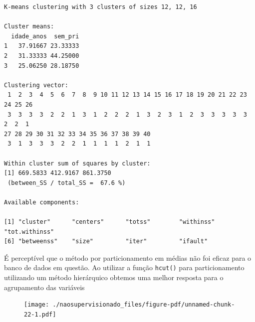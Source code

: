 \documentclass[
  letterpaper,
  DIV=11,
  numbers=noendperiod]{scrreprt}
\newenvironment{Shaded}{\begin{snugshade}}{\end{snugshade}}
\newcommand{\AttributeTok}[1]{\textcolor[rgb]{0.40,0.45,0.13}{#1}}
\newcommand{\DecValTok}[1]{\textcolor[rgb]{0.68,0.00,0.00}{#1}}
\newcommand{\FunctionTok}[1]{\textcolor[rgb]{0.28,0.35,0.67}{#1}}
\newcommand{\NormalTok}[1]{\textcolor[rgb]{0.00,0.23,0.31}{#1}}
\newcommand{\OtherTok}[1]{\textcolor[rgb]{0.00,0.23,0.31}{#1}}
\newcommand{\SpecialCharTok}[1]{\textcolor[rgb]{0.37,0.37,0.37}{#1}}
\newcommand{\StringTok}[1]{\textcolor[rgb]{0.13,0.47,0.30}{#1}}
\begin{document}
\begin{verbatim}
K-means clustering with 3 clusters of sizes 12, 12, 16

Cluster means:
  idade_anos  sem_pri
1   37.91667 23.33333
2   31.33333 44.25000
3   25.06250 28.18750

Clustering vector:
 1  2  3  4  5  6  7  8  9 10 11 12 13 14 15 16 17 18 19 20 21 22 23 24 25 26 
 3  3  3  3  2  2  1  3  1  2  2  2  1  3  2  3  1  2  3  3  3  3  3  2  2  1 
27 28 29 30 31 32 33 34 35 36 37 38 39 40 
 3  1  3  3  3  2  2  1  1  1  1  2  1  1 

Within cluster sum of squares by cluster:
[1] 669.5833 412.9167 861.3750
 (between_SS / total_SS =  67.6 %)

Available components:

[1] "cluster"      "centers"      "totss"        "withinss"     "tot.withinss"
[6] "betweenss"    "size"         "iter"         "ifault"      
\end{verbatim}

É perceptível que o método por particionamento em médias não foi eficaz
para o banco de dados em questão. Ao utilizar a função \texttt{hcut()}
para particionamento utilizando um método hierárquico obtemos uma melhor
resposta para o agrupamento das variáveis

\begin{Shaded}
\end{Shaded}

\begin{figure}[H]

{\centering \texttt{[image: ./naosupervisionado\_files/figure-pdf/unnamed-chunk-22-1.pdf]}

}

\end{figure}
\end{document}
